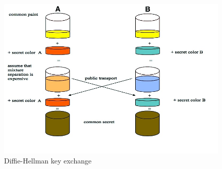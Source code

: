\begin{figure}
  \centering
  \includegraphics[width=.6\textwidth]{res/diffiehellman.jpg}
  \caption{Diffie-Hellman key exchange}
  \label{fig:diffiehellman}
\end{figure}